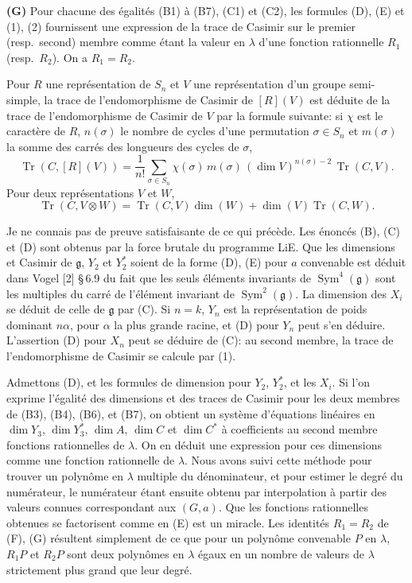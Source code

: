 \documentclass[11pt,a4paper]{article}
\DeclareMathOperator{\Sym}{Sym}
\DeclareMathOperator{\Tr}{Tr}
\newcommand{\frg}{\mathfrak{g}}
\begin{document}
\medskip
\noindent\textbf{(G)} Pour chacune des \'egalit\'es (B1) \`a (B7), (C1) et (C2), les formules (D), (E) et (1), (2) fournissent une expression de la trace de Casimir sur le premier (resp.~second) membre comme \'etant la valeur en $\lambda$ d'une fonction rationnelle $R_1$ (resp.~$R_2$). On a $R_1 = R_2$.

\bigskip

Pour $R$ une repr\'esentation de $S_n$ et $V$ une repr\'esentation d'un groupe semi-simple, la trace de l'endomorphisme de Casimir de $[R](V)$ est d\'eduite de la trace de l'endomorphisme de Casimir de $V$ par la formule suivante: si $\chi$ est le caract\`ere de $R$, $n(\sigma)$ le nombre de cycles d'une permutation $\sigma \in S_n$ et $m(\sigma)$ la somme des carr\'es des longueurs des cycles de $\sigma$,
\begin{equation}\label{eq:casimir-trace}
\Tr(C, [R](V)) = \frac{1}{n!} \sum_{\sigma \in S_n} \chi(\sigma) \, m(\sigma) \, (\dim V)^{n(\sigma)-2} \, \Tr(C, V).
\end{equation}
Pour deux repr\'esentations $V$ et $W$,
\begin{equation}\label{eq:casimir-tensor}
\Tr(C, V \otimes W) = \Tr(C, V) \dim(W) + \dim(V) \Tr(C, W).
\end{equation}

Je ne connais pas de preuve satisfaisante de ce qui pr\'ec\`ede. Les \'enonc\'es (B), (C) et (D) sont obtenus par la force brutale du programme LiE. Que les dimensions et Casimir de $\frg$, $Y_2$ et $Y_2^*$ soient de la forme (D), (E) pour $a$ convenable est d\'eduit dans Vogel [2] \S\,6.9 du fait que les seuls \'el\'ements invariants de $\Sym^4(\frg)$ sont les multiples du carr\'e de l'\'el\'ement invariant de $\Sym^2(\frg)$. La dimension des $X_i$ se d\'eduit de celle de $\frg$ par (C). Si $n = k$, $Y_n$ est la repr\'esentation de poids dominant $n\alpha$, pour $\alpha$ la plus grande racine, et (D) pour $Y_n$ peut s'en d\'eduire. L'assertion (D) pour $X_n$ peut se d\'eduire de (C): au second membre, la trace de l'endomorphisme de Casimir se calcule par (1).

Admettons (D), et les formules de dimension pour $Y_2$, $Y_2^*$, et les $X_i$. Si l'on exprime l'\'egalit\'e des dimensions et des traces de Casimir pour les deux membres de (B3), (B4), (B6), et (B7), on obtient un syst\`eme d'\'equations lin\'eaires en $\dim Y_3$, $\dim Y_3^*$, $\dim A$, $\dim C$ et $\dim C^*$ \`a coefficients au second membre fonctions rationnelles de $\lambda$. On en d\'eduit une expression pour ces dimensions comme une fonction rationnelle de $\lambda$. Nous avons suivi cette m\'ethode pour trouver un polyn\^ome en $\lambda$ multiple du d\'enominateur, et pour estimer le degr\'e du num\'erateur, le num\'erateur \'etant ensuite obtenu par interpolation \`a partir des valeurs connues correspondant aux $(G, a)$. Que les fonctions rationnelles obtenues se factorisent comme en (E) est un miracle. Les identit\'es $R_1 = R_2$ de (F), (G) r\'esultent simplement de ce que pour un polyn\^ome convenable $P$ en $\lambda$, $R_1 P$ et $R_2 P$ sont deux polyn\^omes en $\lambda$ \'egaux en un nombre de valeurs de $\lambda$ strictement plus grand que leur degr\'e.
\end{document}

